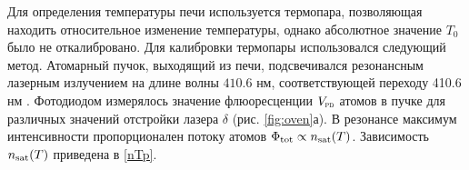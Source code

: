 
\startp
{}
Для определения температуры печи используется термопара, позволяющая находить относительное изменение температуры, однако абсолютное значение $T_0$ было не откалибровано. Для калибровки термопары использовался следующий метод. Атомарный пучок, выходящий из печи, подсвечивался резонансным лазерным излучением на длине волны $410.6$ нм, соответствующей переходу 410.6 нм \cite{vlad}. Фотодиодом измерялось значение флюоресценции  $\subt{V}{PD}$ атомов в пучке для различных значений отстройки лазера $\delta$ (рис. \ref{fig:oven}а). В резонансе максимум интенсивности пропорционален потоку атомов $\Phi_{\textnormal{tot}}  \propto n_{\textnormal{sat}}(T) $. Зависимость  $n_{\textnormal{sat}}(T)$ приведена в \eqref{nTp}.



